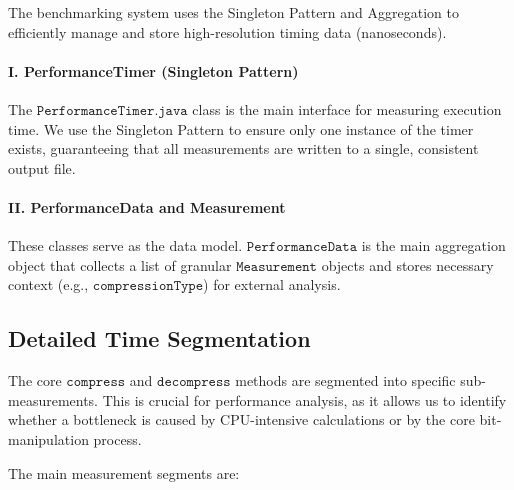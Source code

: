 \documentclass[11pt, a4paper]{article}
\begin{document}
	The benchmarking system uses the Singleton Pattern and Aggregation to efficiently manage and store high-resolution timing data (nanoseconds).
	
	\paragraph{I. PerformanceTimer (Singleton Pattern)}
	The $\texttt{PerformanceTimer.java}$ class is the main interface for measuring execution time. We use the Singleton Pattern to ensure only one instance of the timer exists, guaranteeing that all measurements are written to a single, consistent output file.
	
	\paragraph{II. PerformanceData and Measurement}
	These classes serve as the data model. $\texttt{PerformanceData}$ is the main aggregation object that collects a list of granular $\texttt{Measurement}$ objects and stores necessary context (e.g., $\texttt{compressionType}$) for external analysis.
	
	\subsection{Detailed Time Segmentation}
	\label{sec:time_segmentation}
	
	The core $\texttt{compress}$ and $\texttt{decompress}$ methods are segmented into specific sub-measurements. This is crucial for performance analysis, as it allows us to identify whether a bottleneck is caused by CPU-intensive calculations or by the core bit-manipulation process.
	
	The main measurement segments are:
	
\end{document}

